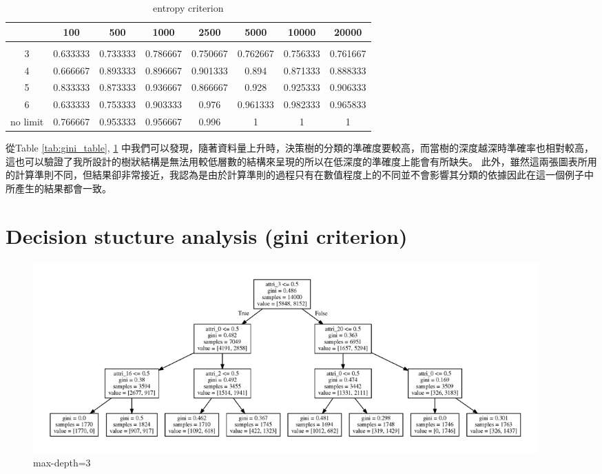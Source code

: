\documentclass[8pt,a4paper]{article}
\begin{document}
\begin{table}[H]
    \centering
    \begin{tabular}{cccccccc}
        \hline
        & 100 & 500 & 1000 & 2500 & 5000 & 10000 & 20000 \\ \hline \\
    3 & 0.633333 & 0.733333 & 0.786667 & 0.750667 & 0.762667 & 0.756333 & 0.761667 \\
    4 & 0.666667 & 0.893333 & 0.896667 & 0.901333 & 0.894 & 0.871333 & 0.888333 \\
    5 & 0.833333 & 0.873333 & 0.936667 & 0.866667 & 0.928 & 0.925333 & 0.906333 \\
    6 & 0.633333 & 0.753333 & 0.903333 & 0.976 & 0.961333 & 0.982333 & 0.965833 \\
    no limit & 0.766667 & 0.953333 & 0.956667 & 0.996 & 1 & 1 & 1
    \end{tabular}
    \caption{entropy criterion}
    \label{tab:entropy_table}
\end{table}

從Table \ref{tab:gini_table}, \ref{tab:entropy_table} 中我們可以發現，隨著資料量上升時，決策樹的分類的準確度要較高，而當樹的深度越深時準確率也相對較高，這也可以驗證了我所設計的樹狀結構是無法用較低層數的結構來呈現的所以在低深度的準確度上能會有所缺失。
此外，雖然這兩張圖表所用的計算準則不同，但結果卻非常接近，我認為是由於計算準則的過程只有在數值程度上的不同並不會影響其分類的依據因此在這一個例子中所產生的結果都會一致。\\



\section*{Decision stucture analysis (gini criterion)} 
\label{sec:Decision stucture analysis (gini criterion)}

\begin{figure}[H]
    \begin{center}
        \includegraphics[width=550pt]{decision_tree_depth_m1_3.png}
        \caption{max-depth=3}
        
    \end{center}
\end{figure}
\end{document}

